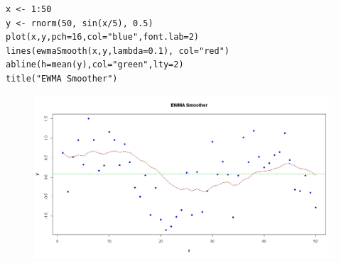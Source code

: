 \documentclass[a4paper,12pt]{article}
\begin{document}
\begin{framed}
\begin{verbatim}
x <- 1:50
y <- rnorm(50, sin(x/5), 0.5)
plot(x,y,pch=16,col="blue",font.lab=2)
lines(ewmaSmooth(x,y,lambda=0.1), col="red")
abline(h=mean(y),col="green",lty=2)
title("EWMA Smoother")
\end{verbatim}
\end{framed}
\begin{figure}
\centering
\includegraphics[width=0.7\linewidth]{./qccEWMAsmoother}
\caption{}
\label{fig:qccEWMAsmoother}
\end{figure}
\end{document}
